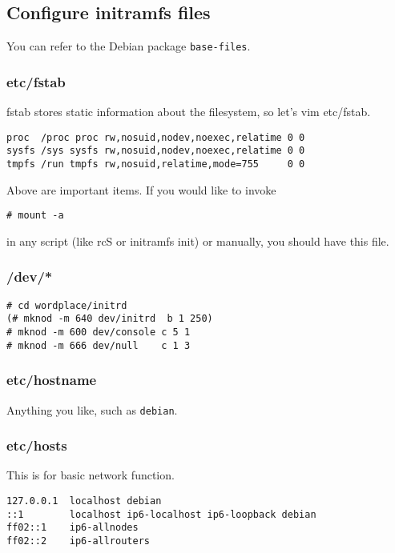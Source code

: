 \documentclass[10pt,a4paper]{article}
\begin{document}
\subsection{Configure initramfs files}
You can refer to the Debian package \texttt{base-files}.
\subsubsection{etc/fstab}
fstab stores static information about the filesystem, so let's vim etc/fstab.
\begin{framed}\begin{verbatim}
proc  /proc proc rw,nosuid,nodev,noexec,relatime 0 0
sysfs /sys sysfs rw,nosuid,nodev,noexec,relatime 0 0
tmpfs /run tmpfs rw,nosuid,relatime,mode=755     0 0
\end{verbatim}\end{framed}
Above are important items. If you would like to invoke
\begin{verbatim}
# mount -a
\end{verbatim}
in any script (like rcS or initramfs init) or manually, you should have this file.

\subsubsection{/dev/*}
\begin{framed}\begin{verbatim}
# cd wordplace/initrd
(# mknod -m 640 dev/initrd  b 1 250)
# mknod -m 600 dev/console c 5 1
# mknod -m 666 dev/null    c 1 3
\end{verbatim}\end{framed}

\subsubsection{etc/hostname}
Anything you like, such as \texttt{debian}.

\subsubsection{etc/hosts}
This is for basic network function.
\begin{framed}\begin{verbatim}
127.0.0.1  localhost debian
::1        localhost ip6-localhost ip6-loopback debian
ff02::1    ip6-allnodes
ff02::2    ip6-allrouters
\end{verbatim}\end{framed}
\end{document}
